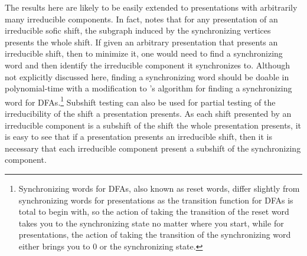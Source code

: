 \documentclass[hidelinks]{report}
\theoremstyle{definition}
\begin{document}
\begin{figure}[h]
    \centering

    \caption{}
    \label{notevenshift}
\end{figure}

The results here are likely to be easily extended to presentations with arbitrarily 
many irreducible components. In fact, \cite{jonoska1996sofic} notes that 
for any presentation of an irreducible sofic shift, the subgraph 
induced by the synchronizing vertices presents the whole shift.
If given 
an arbitrary presentation that presents an irreducible shift, then 
to minimize it, one would need to find a synchronizing word and then 
identify the irreducible component it synchronizes to. Although not 
explicitly discussed here, finding a synchronizing word should be doable in 
polynomial-time with a modification to \cite{eppstein1990reset}'s algorithm for 
finding a synchronizing word for DFAs.\footnote{
    Synchronizing words for DFAs, also known as reset words, differ slightly  
    from synchronizing words for presentations as the transition function 
    for DFAs is total to begin with, so the action of 
    taking the transition of the reset word takes you to the synchronizing 
    state no matter where you start, while for presentations, the action 
    of taking the transition of the synchronizing word either brings you 
    to \(0\) or the synchronizing state.
} Subshift testing can also be used for partial testing of the irreducibility 
of the shift a presentation presents. 
As each shift presented by an irreducible component is a subshift 
of the shift the whole presentation presents, it is easy to see that 
if a presentation presents an irreducible shift, then it is 
necessary that each irreducible component present a subshift of the 
synchronizing component. 
\end{document}
